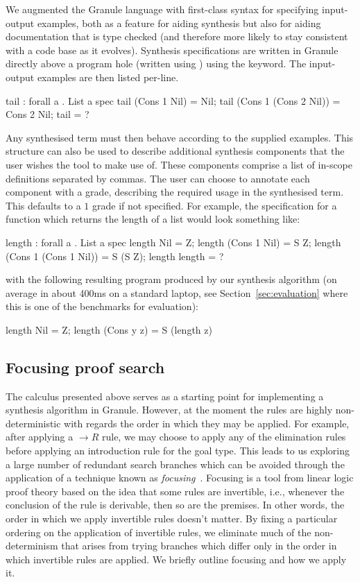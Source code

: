 We augmented the Granule language with first-class syntax for specifying
input-output examples, both as a feature for aiding synthesis
but also for aiding documentation
that is type checked (and therefore more likely to stay consistent with
a code base as it evolves). Synthesis specifications
are written in Granule directly above a program hole
(written using ) using the  keyword. The input-output
examples are then listed per-line.
\begin{granule}
tail : forall a . List a %
spec
  tail (Cons 1 Nil) = Nil;
  tail (Cons 1 (Cons 2 Nil)) = Cons 2 Nil;
tail = ?
\end{granule}
Any synthesised term must then behave according to the supplied examples. This
 structure can also be used to describe additional synthesis
components that the user wishes the tool to make use of. These components comprise a
list of in-scope definitions separated by commas. The user can choose to
annotate each component with a grade, describing the required usage in the
synthesised term. This defaults to a $1$ grade if not specified.
For example, the specification for a function which returns the length of a list would look
something like:
\begin{granule}
length : forall a . List a %
spec
    length Nil = Z;
    length (Cons 1 Nil) = S Z;
    length (Cons 1 (Cons 1 Nil)) = S (S Z);
    length %
length = ?
\end{granule}
with the following resulting program produced by our synthesis algorithm (on average
in about 400ms on a standard laptop, see Section~\ref{sec:evaluation} where this is one of the benchmarks for evaluation):
\begin{granule}
length Nil = Z;
length (Cons y z) = S (length z)
\end{granule}

\subsection{Focusing proof search}
\label{sec:focusing}
The calculus presented above serves as a starting point for implementing a
synthesis algorithm in Granule. However, at the moment the rules are highly
non-deterministic with regards the order in which they may be applied. For
example, after applying a $\rightarrow{R}$ rule, we may choose to apply any of
the elimination rules before applying an introduction rule for the
goal type. This leads to us exploring a large number of redundant search branches which can
be avoided through the application of a technique known as
\textit{focusing}~\cite{focusing}. Focusing is a tool from linear logic proof
theory based on the idea that some rules are invertible, i.e., whenever the
conclusion of the rule is derivable, then so are the premises. In other words, the order in which we apply invertible rules doesn't
matter. By fixing a particular ordering on the application of invertible rules, we eliminate much of the
non-determinism that arises from trying branches which differ only in the order in
which invertible rules are applied. We briefly outline focusing and how we
apply it.

